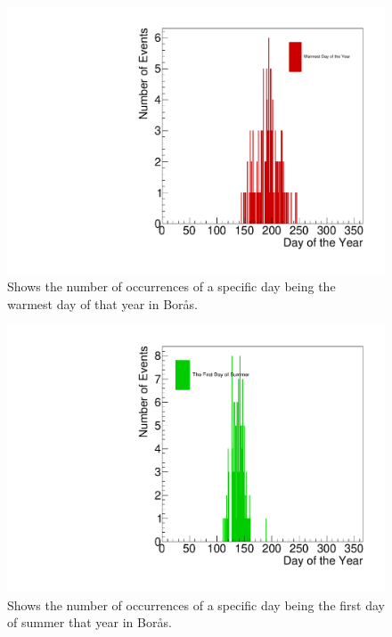 \documentclass[a4, 12pt]{article}
\begin{document}
\begin{figure}[H]
\centering
\includegraphics[scale=0.50]{philipHot.pdf}
\caption{Shows the number of occurrences of a specific day being the warmest day of that year in Borås.}
\end{figure}

\begin{figure}[H]
\centering
\includegraphics[scale=0.50]{philipSummer.pdf}
\caption{Shows the number of occurrences of a specific day being the first day of summer that year in Borås.}
\end{figure}
\newpage
\end{document}
